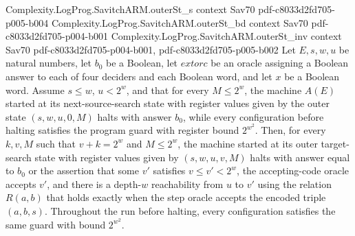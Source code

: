 \begin{theorem}
\proofstep
  {Complexity.LogProg.SavitchARM.outerSt_s}
  {context}
  {Sav70}
  {pdf-c8033d2fd705-p005-b004}
\proofstep
  {Complexity.LogProg.SavitchARM.outerSt_bd}
  {context}
  {Sav70}
  {pdf-c8033d2fd705-p004-b001}
\proofstep
  {Complexity.LogProg.SavitchARM.outerSt_inv}
  {context}
  {Sav70}
  {pdf-c8033d2fd705-p004-b001,
    pdf-c8033d2fd705-p005-b002}
Let $E,s,w,u$ be natural numbers, let $b_0$ be a Boolean, let $	ext{orc}$ be an oracle
assigning a Boolean answer to each of four deciders and each Boolean word, and let $x$
be a Boolean word. Assume $s\le w$, $u<2^w$, and that for every $M\le 2^w$, the machine
$A(E)$ started at its next-source-search state with register values given by the outer
state $(s,w,u,0,M)$ halts with answer $b_0$, while every configuration before halting
satisfies the program guard with register bound $2^{w^2}$. Then, for every $k,v,M$ such
that $v+k=2^w$ and $M\le 2^w$, the machine started at its outer target-search state with
register values given by $(s,w,u,v,M)$ halts with answer equal to $b_0$ or the assertion
that some $v'$ satisfies $v\le v'<2^w$, the accepting-code oracle accepts $v'$, and
there is a depth-$w$ reachability from $u$ to $v'$ using the relation $R(a,b)$ that
holds exactly when the step oracle accepts the encoded triple $(a,b,s)$. Throughout the
run before halting, every configuration satisfies the same guard with bound $2^{w^2}$.
\end{theorem}

